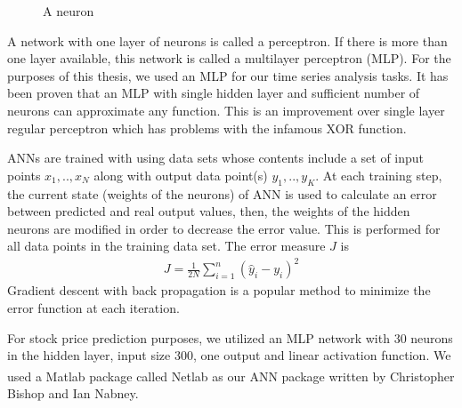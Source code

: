 \begin{figure}[h]
\caption{A neuron}
\vspace{0.6cm}
\end{figure}

A network with one layer of neurons is called a perceptron. If there is more
than one layer available, this network is called a multilayer perceptron
(MLP). For the purposes of this thesis, we used an MLP for our time series
analysis tasks. It has been proven that an MLP with single hidden layer and
sufficient number of neurons can approximate any function. This is an
improvement over single layer regular perceptron which has problems with the
infamous XOR function.

ANNs are trained with using data sets whose contents include a set of input
points $x_1,..,x_N$ along with output data point(s) $y_1,..,y_K$. At each
training step, the current state (weights of the neurons) of ANN is used to
calculate an error between predicted and real output values, then, the weights
of the hidden neurons are modified in order to decrease the error value. This is
performed for all data points in the training data set. The error measure $J$ is
\begin{eqnarray*}
J = \frac{1}{2N}\sum_{i=1}^n (\hat{y}_i - y_i)^2
\end{eqnarray*}
Gradient descent with back propagation is a popular method to minimize the error
function at each iteration. 

For stock price prediction purposes, we utilized an MLP network with 30 neurons
in the hidden layer, input size 300, one output and linear activation
function. We used a Matlab\textsuperscript{\textregistered} package called
Netlab as our ANN package written by Christopher Bishop and Ian Nabney.

